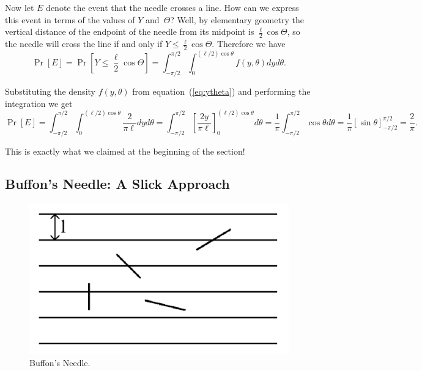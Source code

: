 \documentclass[11pt]{article}
\begin{document}
Now let $E$ denote the event that the needle crosses a line.  How can we
express this event in terms of the values of $Y$ and~$\Theta$?  Well, by
elementary geometry the vertical distance of the endpoint of the needle from
its midpoint is $\frac{\ell}{2}\cos\Theta$, so the needle will cross
the line if and only if $Y\le \frac{\ell}{2}\cos\Theta$.  Therefore we have $$
   \Pr[E] = \Pr[Y \le {\textstyle\frac{\ell}{2}}\cos\Theta] =
\int_{-\pi/2}^{\pi/2}\int_0^{(\ell/2)\cos\theta}
f(y,\theta)dyd\theta.
$$

Substituting the density $f(y,\theta)$ from equation~(\ref{eq:ytheta}) and performing
the integration we get
\begin{equation*}
    \Pr[E] = \int_{-\pi/2}^{\pi/2}\int_0^{(\ell/2)\cos\theta} \frac{2}{\pi\ell} dyd\theta
               = \int_{-\pi/2}^{\pi/2} \left[\frac{2y}{\pi\ell}\right]_0^{(\ell/2)\cos\theta}d\theta
               = \frac{1}{\pi}\int_{-\pi/2}^{\pi/2} \cos\theta d\theta
               = \frac{1}{\pi}\left[\sin\theta\right]_{-\pi/2}^{\pi/2}
               = \frac{2}{\pi}.
\end{equation*}

This is exactly what we claimed at the beginning of the section!

\subsection*{Buffon's Needle: A Slick Approach}

\begin{figure}[h]
\begin{center}
\includegraphics[scale=0.4]{needle.pdf}
\end{center}
\caption{Buffon's Needle.}
\label{fig:needle}
\end{figure}
\end{document}
